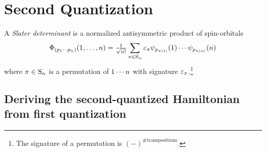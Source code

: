 \documentclass[11pt]{article}
\numberwithin{equation}{section}
\begin{document}
\setlength{\abovedisplayskip}{3pt}
\setlength{\belowdisplayskip}{3pt}

\section{Second Quantization}


\begin{dfn}\label{dfn:slater-determinant}
A \textit{Slater determinant} is a normalized antisymmetric product of spin-orbitals
\begin{align}\label{eq:slater-determinant-position-representation}
  \F_{(p_1\cd p_n)}(1,\ld,n)
=
  \tfr{1}{\sqrt{n!}}
  \sum_{\pi\in\mr{S}_n}
  \e_{\pi}
  \y_{p_{\pi(1)}}(1)\cd\y_{p_{\pi(n)}}(n)
\end{align}
where $\pi\in\mr{S}_n$ is a permutation of $1\cdots n$ with signature $\e_{\pi}$.\footnote{The signature of a permutation is $(-)^{\text{\# transpositions}}$.}
\end{dfn}

\subsection{Deriving the second-quantized Hamiltonian from first quantization}\label{ssec:direct-derivation-of-second-quantization}
\end{document}
